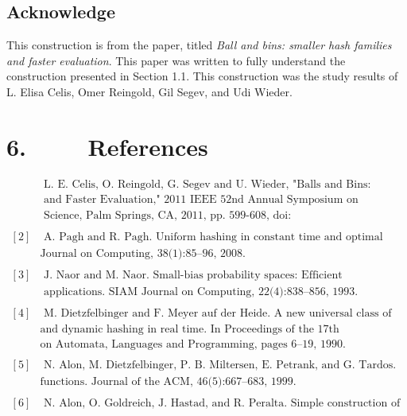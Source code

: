 \documentclass[a4paper, english]{paper}
\begin{document}
	 \subsection{Acknowledge} 
	 This construction is from the paper, titled \textit{Ball and bins: smaller hash families and faster evaluation}. This paper was written to fully understand the construction presented in Section 1.1. This construction was the study results of L. Elisa Celis, Omer Reingold, Gil Segev, and Udi Wieder. 	
	 
	\newpage
	\section{6. $\qquad$ References}
\begin{align*}
	[1]&\text{ L. E. Celis, O. Reingold, G. Segev and U. Wieder, "Balls and Bins: Smaller Hash Families}\\
	&\text{ and Faster Evaluation," 2011 IEEE 52nd Annual Symposium on Foundations of Computer }\\
	&\text{ Science, Palm Springs, CA, 2011, pp. 599-608, doi: 10.1109/FOCS.2011.49.}\\
&\\
	[2] &\text{ A. Pagh and R. Pagh. Uniform hashing in constant time and optimal space. SIAM}\\
	&\text{Journal on Computing, 38(1):85–96, 2008.}\\
&\\
	[3] &\text{ J. Naor and M. Naor. Small-bias probability spaces: Efficient constructions and}\\
	&\text{ applications. SIAM Journal on Computing, 22(4):838–856, 1993.}\\
&\\
	[4]&\text{ M. Dietzfelbinger and F. Meyer auf der Heide. A new universal class of hash functions}\\
	&\text{and dynamic hashing in real time. In Proceedings of the 17th International Colloquium}\\
	&\text{on Automata, Languages and Programming, pages 6–19, 1990.}\\
&\\
	[5]&\text{ N. Alon, M. Dietzfelbinger, P. B. Miltersen, E. Petrank, and G. Tardos. Linear hash}\\
	&\text{functions. Journal of the ACM, 46(5):667–683, 1999.}\\
&\\
	[6]&\text{ N. Alon, O. Goldreich, J. Hastad, and R. Peralta. Simple construction of almost kwise}\\

\end{align*}
\end{document}
